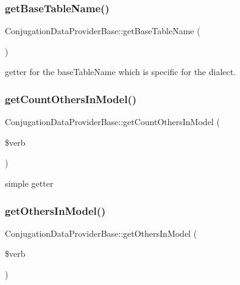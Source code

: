 \subsubsection{\texorpdfstring{get\+Base\+Table\+Name()}{getBaseTableName()}}
{\footnotesize\ttfamily Conjugation\+Data\+Provider\+Base\+::get\+Base\+Table\+Name (\begin{DoxyParamCaption}{ }\end{DoxyParamCaption})\hspace{0.3cm}{\ttfamily [protected]}}



getter for the base\+Table\+Name which is specific for the dialect. 

\hypertarget{class_conjugation_data_provider_base_a155bfe75cdc9224801c2704540205650}{}\label{class_conjugation_data_provider_base_a155bfe75cdc9224801c2704540205650} 
\subsubsection{\texorpdfstring{get\+Count\+Others\+In\+Model()}{getCountOthersInModel()}}
{\footnotesize\ttfamily Conjugation\+Data\+Provider\+Base\+::get\+Count\+Others\+In\+Model (\begin{DoxyParamCaption}\item[{}]{\$verb }\end{DoxyParamCaption})\hspace{0.3cm}{\ttfamily [abstract]}}

simple getter \hypertarget{class_conjugation_data_provider_base_a964e48a9e1d9c507fdb19e96737c09e4}{}\label{class_conjugation_data_provider_base_a964e48a9e1d9c507fdb19e96737c09e4} 
\subsubsection{\texorpdfstring{get\+Others\+In\+Model()}{getOthersInModel()}}
{\footnotesize\ttfamily Conjugation\+Data\+Provider\+Base\+::get\+Others\+In\+Model (\begin{DoxyParamCaption}\item[{}]{\$verb }\end{DoxyParamCaption})\hspace{0.3cm}{\ttfamily [abstract]}}

